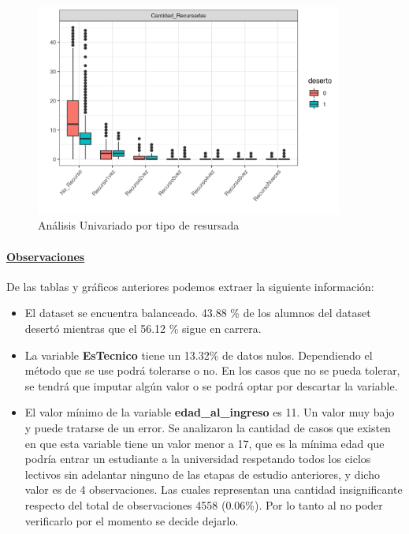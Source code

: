 \begin{figure}[!htb]
	\centering
	\includegraphics[width=0.9\textwidth]{imagenes/imagenes/gg_explo_tablon_tipo_recur.png}
	\caption{Análisis Univariado por tipo de resursada}
	\label{fig:tablon_boxplot_tipoRecursada}
\end{figure}

\FloatBarrier

\hypertarget{observaciones}{%
	\paragraph{\textbf{\underline{Observaciones}}}\label{observaciones}}

De las tablas y gráficos anteriores podemos extraer la siguiente
información:

\begin{itemize}
	\item
	El dataset se encuentra balanceado. 43.88 \% de los alumnos del
	dataset desertó mientras que el 56.12 \% sigue en carrera.
	\item
	La variable \textbf{EsTecnico} tiene un 13.32\% de datos nulos.
	Dependiendo el método que se use podrá tolerarse o no. En los casos
	que no se pueda tolerar, se tendrá que imputar algún valor o se podrá
	optar por descartar la variable.
	\item
	El valor mínimo de la variable \textbf{edad\_al\_ingreso} es 11. Un
	valor muy bajo y puede tratarse de un error. Se analizaron la cantidad
	de casos que existen en que esta variable tiene un valor menor a 17,
	que es la mínima edad que podría entrar un estudiante a la universidad
	respetando todos los ciclos lectivos sin adelantar ninguno de las
	etapas de estudio anteriores, y dicho valor es de 4 observaciones. Las
	cuales representan una cantidad insignificante respecto del total de
	observaciones 4558 (0.06\%). Por lo tanto al no poder verificarlo por
	el momento se decide dejarlo.
\end{itemize}

